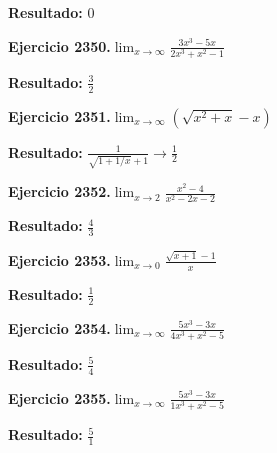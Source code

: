 \documentclass[10pt,a4paper]{article}
\begin{document}
\begin{solbox}
\textbf{Resultado:} \(\displaystyle 0\)
\end{solbox}

\begin{ejbox}
\textbf{Ejercicio 2350.}\quad $\lim_{x\to \infty} \frac{3x^3 - 5x}{2x^3 + x^2 - 1}$
\end{ejbox}

\begin{solbox}
\textbf{Resultado:} \(\displaystyle \frac{3}{2}\)
\end{solbox}

\newpage
\begin{ejbox}
\textbf{Ejercicio 2351.}\quad $\lim_{x\to \infty} (\sqrt{x^2+x} - x)$
\end{ejbox}

\begin{solbox}
\textbf{Resultado:} \(\displaystyle \frac{1}{\sqrt{1+1/x}+1} \to \frac{1}{2}\)
\end{solbox}

\begin{ejbox}
\textbf{Ejercicio 2352.}\quad $\lim_{x\to 2} \frac{x^2-4}{x^2-2x-2}$
\end{ejbox}

\begin{solbox}
\textbf{Resultado:} \(\displaystyle \frac{4}{3}\)
\end{solbox}

\begin{ejbox}
\textbf{Ejercicio 2353.}\quad $\lim_{x\to 0} \frac{\sqrt{x+1}-1}{x}$
\end{ejbox}

\begin{solbox}
\textbf{Resultado:} \(\displaystyle \frac{1}{2}\)
\end{solbox}

\newpage
\begin{ejbox}
\textbf{Ejercicio 2354.}\quad $\lim_{x\to \infty} \frac{5x^3 - 3x}{4x^3 + x^2 - 5}$
\end{ejbox}

\begin{solbox}
\textbf{Resultado:} \(\displaystyle \frac{5}{4}\)
\end{solbox}

\begin{ejbox}
\textbf{Ejercicio 2355.}\quad $\lim_{x\to \infty} \frac{5x^3 - 3x}{1x^3 + x^2 - 5}$
\end{ejbox}

\begin{solbox}
\textbf{Resultado:} \(\displaystyle \frac{5}{1}\)
\end{solbox}
\end{document}
